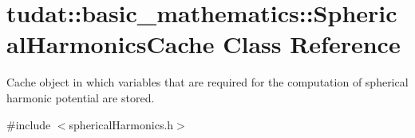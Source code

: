 \hypertarget{classtudat_1_1basic__mathematics_1_1SphericalHarmonicsCache}{}\section{tudat\+:\+:basic\+\_\+mathematics\+:\+:Spherical\+Harmonics\+Cache Class Reference}
\label{classtudat_1_1basic__mathematics_1_1SphericalHarmonicsCache}


Cache object in which variables that are required for the computation of spherical harmonic potential are stored.  




{\ttfamily \#include $<$spherical\+Harmonics.\+h$>$}

